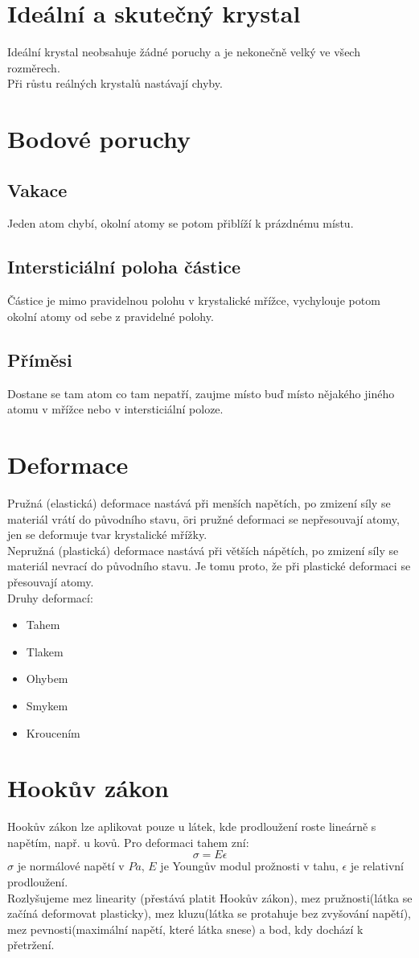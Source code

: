 \documentclass[titlepage]{book}
\begin{document}
\section{Ideální a skutečný krystal}
Ideální krystal neobsahuje žádné poruchy a je nekonečně velký ve všech rozměrech.\\
Při růstu reálných krystalů nastávají chyby.
\section{Bodové poruchy}
\subsection{Vakace}
Jeden atom chybí, okolní atomy se potom přiblíží k prázdnému místu.
\subsection{Intersticiální poloha částice}
Částice je mimo pravidelnou polohu v krystalické mřížce, vychylouje potom okolní atomy od sebe z pravidelné polohy.
\subsection{Příměsi}
Dostane se tam atom co tam nepatří, zaujme místo buď místo nějakého jiného atomu v mřížce nebo v intersticiální poloze.
\section{Deformace}
Pružná (elastická) deformace nastává při menších napětích, po zmizení síly se materiál vrátí do původního stavu, öri pružné deformaci se nepřesouvají atomy, jen se deformuje tvar krystalické mřížky.\\
Nepružná (plastická) deformace nastává při větších nápětích, po zmizení síly se materiál nevrací do původního stavu. Je tomu proto, že při plastické deformaci se přesouvají atomy.\\
Druhy deformací:\\
\begin{itemize}
\item Tahem
\item Tlakem
\item Ohybem
\item Smykem
\item Kroucením
\end{itemize}
\section{Hookův zákon}
Hookův zákon lze aplikovat pouze u látek, kde prodloužení roste lineárně s napětím, např. u kovů. Pro deformaci tahem zní:\\
\begin{equation}
\sigma = E \epsilon
\end{equation}
$\sigma$ je normálové napětí v $Pa$, $E$ je Youngův modul prožnosti v tahu, $\epsilon$ je relativní prodloužení.\\
Rozlyšujeme mez linearity (přestává platit Hookův zákon), mez pružnosti(látka se začíná deformovat plasticky), mez kluzu(látka se protahuje bez zvyšování napětí), mez pevnosti(maximální napětí, které látka snese) a bod, kdy dochází k přetržení.
\end{document}
